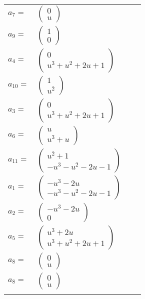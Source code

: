 \documentclass[1p]{elsarticle_modified}
\theoremstyle{definition}
\begin{document}
\begin{tabular}{m{7pt} m{180pt} m{7pt} m{180pt} }
\flushright $a_{7}=$&$\begin{pmatrix}0\\u\end{pmatrix}$ \\
\flushright $a_{9}=$&$\begin{pmatrix}1\\0\end{pmatrix}$ \\
\flushright $a_{4}=$&$\begin{pmatrix}0\\u^3+u^2+2 u+1\end{pmatrix}$ \\
\flushright $a_{10}=$&$\begin{pmatrix}1\\u^2\end{pmatrix}$ \\
\flushright $a_{3}=$&$\begin{pmatrix}0\\u^3+u^2+2 u+1\end{pmatrix}$ \\
\flushright $a_{6}=$&$\begin{pmatrix}u\\u^3+u\end{pmatrix}$ \\
\flushright $a_{11}=$&$\begin{pmatrix}u^2+1\\- u^3- u^2-2 u-1\end{pmatrix}$ \\
\flushright $a_{1}=$&$\begin{pmatrix}- u^3-2 u\\- u^3- u^2-2 u-1\end{pmatrix}$ \\
\flushright $a_{2}=$&$\begin{pmatrix}- u^3-2 u\\0\end{pmatrix}$ \\
\flushright $a_{5}=$&$\begin{pmatrix}u^3+2 u\\u^3+u^2+2 u+1\end{pmatrix}$ \\
\flushright $a_{8}=$&$\begin{pmatrix}0\\u\end{pmatrix}$\\ \flushright $a_{8}=$&$\begin{pmatrix}0\\u\end{pmatrix}$\\&\end{tabular}
\end{document}
